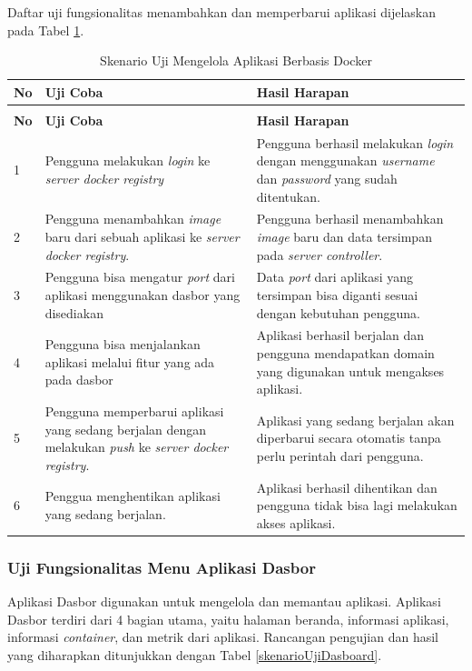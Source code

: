             \indent Daftar uji fungsionalitas menambahkan dan memperbarui aplikasi dijelaskan pada Tabel \ref{ujiaplikasi}.
            \begin{longtable}{|p{}|p{}|p{}|}					\caption{Skenario Uji Mengelola Aplikasi Berbasis Docker} \label{ujiaplikasi} \\
					\hline
					\textbf{No} & \textbf{Uji Coba} & \textbf{Hasil Harapan} \\ \hline
					\endfirsthead
					\caption[]{Skenario Uji Mengelola Aplikasi Berbasis Docker} \\
					\hline
					\textbf{No} & \textbf{Uji Coba} & \textbf{Hasil Harapan} \\ \hline
					\endhead
					\endfoot
					\endlastfoot
					
                    1 & Pengguna melakukan \textit{login} ke \textit{server docker registry} & Pengguna berhasil melakukan \textit{login} dengan menggunakan \textit{username} dan \textit{password} yang sudah ditentukan. \\ \hline
                    2 & Pengguna menambahkan \textit{image} baru dari sebuah aplikasi ke \textit{server docker registry}. & Pengguna berhasil menambahkan \textit{image} baru dan data tersimpan pada \textit{server controller}. \\ \hline
                    3 & Pengguna bisa mengatur \textit{port} dari aplikasi menggunakan dasbor yang disediakan & Data \textit{port} dari aplikasi yang tersimpan bisa diganti sesuai dengan kebutuhan pengguna. \\ \hline
                    4 & Pengguna bisa menjalankan aplikasi melalui fitur yang ada pada dasbor & Aplikasi berhasil berjalan dan pengguna mendapatkan domain yang digunakan untuk mengakses aplikasi. \\ \hline
					5 & Pengguna memperbarui aplikasi yang sedang berjalan dengan melakukan \textit{push} ke \textit{server docker registry}. & Aplikasi yang sedang berjalan akan diperbarui secara otomatis tanpa perlu perintah dari pengguna. \\ \hline
                    6 & Penggua menghentikan aplikasi yang sedang berjalan. & Aplikasi berhasil dihentikan dan pengguna tidak bisa lagi melakukan akses aplikasi. \\ \hline
				\end{longtable}
            
        \subsubsection{Uji Fungsionalitas Menu Aplikasi Dasbor}
        	Aplikasi Dasbor digunakan untuk mengelola dan memantau aplikasi. Aplikasi Dasbor terdiri dari 4 bagian utama, yaitu halaman beranda, informasi aplikasi, informasi \textit{container}, dan metrik dari aplikasi. Rancangan pengujian dan hasil yang diharapkan ditunjukkan dengan Tabel \ref{skenarioUjiDasboard}.
            
